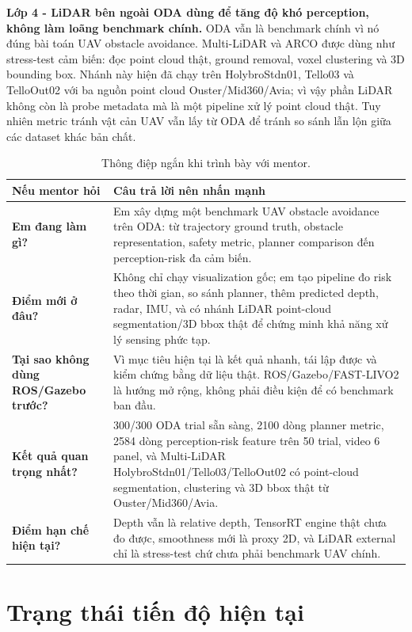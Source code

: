 \documentclass[10pt,a4paper]{article}
\begin{document}
\textbf{Lớp 4 - LiDAR bên ngoài ODA dùng để tăng độ khó perception, không làm loãng benchmark chính.}
ODA vẫn là benchmark chính vì nó đúng bài toán UAV obstacle avoidance. Multi-LiDAR và ARCO được dùng như stress-test cảm biến: đọc point cloud thật, ground removal, voxel clustering và 3D bounding box. Nhánh này hiện đã chạy trên HolybroStdn01, Tello03 và TelloOut02 với ba nguồn point cloud Ouster/Mid360/Avia; vì vậy phần LiDAR không còn là probe metadata mà là một pipeline xử lý point cloud thật. Tuy nhiên metric tránh vật cản UAV vẫn lấy từ ODA để tránh so sánh lẫn lộn giữa các dataset khác bản chất.

\begin{table}[H]
\centering
\small
\caption{Thông điệp ngắn khi trình bày với mentor.}
\begin{tabularx}{0.96\linewidth}{>{\bfseries}p{3.0cm} X}
\toprule
Nếu mentor hỏi & Câu trả lời nên nhấn mạnh \\
\midrule
Em đang làm gì? & Em xây dựng một benchmark UAV obstacle avoidance trên ODA: từ trajectory ground truth, obstacle representation, safety metric, planner comparison đến perception-risk đa cảm biến. \\
Điểm mới ở đâu? & Không chỉ chạy visualization gốc; em tạo pipeline đo risk theo thời gian, so sánh planner, thêm predicted depth, radar, IMU, và có nhánh LiDAR point-cloud segmentation/3D bbox thật để chứng minh khả năng xử lý sensing phức tạp. \\
Tại sao không dùng ROS/Gazebo trước? & Vì mục tiêu hiện tại là kết quả nhanh, tái lập được và kiểm chứng bằng dữ liệu thật. ROS/Gazebo/FAST-LIVO2 là hướng mở rộng, không phải điều kiện để có benchmark ban đầu. \\
Kết quả quan trọng nhất? & 300/300 ODA trial sẵn sàng, 2100 dòng planner metric, 2584 dòng perception-risk feature trên 50 trial, video 6 panel, và Multi-LiDAR HolybroStdn01/Tello03/TelloOut02 có point-cloud segmentation, clustering và 3D bbox thật từ Ouster/Mid360/Avia. \\
Điểm hạn chế hiện tại? & Depth vẫn là relative depth, TensorRT engine thật chưa đo được, smoothness mới là proxy 2D, và LiDAR external chỉ là stress-test chứ chưa phải benchmark UAV chính. \\
\bottomrule
\end{tabularx}
\end{table}

\section{Trạng thái tiến độ hiện tại}
\end{document}
